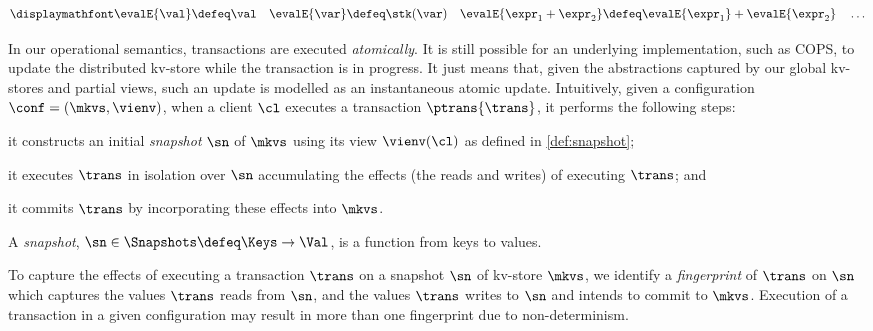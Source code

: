 \vspace{-5pt}
{%
\[
\displaymathfont
\begin{gathered}
\evalE{\val} \defeq
\val
\quad
\evalE{\var} \defeq
\stk(\var)
\quad
\evalE{\expr_{1} + \expr_{2}} \defeq
\evalE{\expr_{1}} + \evalE{\expr_{2}}
\quad
\dots
\end{gathered}%
\]
}%

   In our operational semantics, transactions are executed
\emph{atomically}. It is still possible for an underlying
implementation, such as COPS, to update the distributed kv-store while
the transaction is in progress. It just means that, given the
abstractions captured by our global kv-stores and partial views, 
such an update is modelled as  an instantaneous  atomic
update.
Intuitively, given a configuration $\conf = (\mkvs, \vienv)$, 
when a client $\cl$ executes a transaction $\ptrans{\trans}$, 
it performs the following steps: 
\begin{enumerate*}
	\item it constructs an initial \emph{snapshot} $\sn$ of $\mkvs$ using its view $\vienv(\cl)$ as defined in \cref{def:snapshot};  
	\item it executes $\trans$ in isolation over $\sn$
        accumulating the effects (the reads and writes) of executing $\trans$; and
	\item it commits $\trans$ by incorporating these effects into $\mkvs$.
\end{enumerate*}

\begin{definition}[Snapshots]
\label{def:heaps}
A \emph{snapshot}, \( \sn \in \Snapshots \defeq \Keys \to
\Val\),  is a function from keys to values.
\end{definition}


To capture the effects of executing a transaction $\trans$ on a snapshot $\sn$ of kv-store $\mkvs$, 
we identify a \emph{fingerprint}  of $\trans$ on $\sn$ which captures
 the values $\trans$ reads from $\sn$, and
the values $\trans$ writes to $\sn$ and intends to commit to $\mkvs$. 
Execution of a transaction in a given configuration may result in more than one fingerprint due to non-determinism. 

